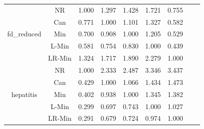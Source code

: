 \documentclass[11pt]{book}
\begin{document}
\begin{table}
\begin{tabular}{|c|c|c|c|c|c|c|c|c|}
    \hline
    \multirow{5}{*}{fd\_reduced}
         & NR & 1.000 & 1.297 & 1.428 & 1.721 & 0.755 \\                                                                                                                                                             
         & Can & 0.771 & 1.000 & 1.101 & 1.327 & 0.582 \\                                                                                                                                                            
         & Min & 0.700 & 0.908 & 1.000 & 1.205 & 0.529 \\                                                                                                                                                            
         & L-Min & 0.581 & 0.754 & 0.830 & 1.000 & 0.439 \\                                                                                                                                                          
         & LR-Min & 1.324 & 1.717 & 1.890 & 2.279 & 1.000 \\
    
    \hline
    \multirow{5}{*}{hepatitis}
         & NR & 1.000 & 2.333 & 2.487 & 3.346 & 3.437 \\                                                                                                                                                             
         & Can & 0.429 & 1.000 & 1.066 & 1.434 & 1.473 \\                                                                                                                                                            
         & Min & 0.402 & 0.938 & 1.000 & 1.345 & 1.382 \\                                                                                                                                                            
         & L-Min & 0.299 & 0.697 & 0.743 & 1.000 & 1.027 \\                                                                                                                                                          
         & LR-Min & 0.291 & 0.679 & 0.724 & 0.974 & 1.000 \\
         

\end{tabular}
\end{table}
\end{document}
